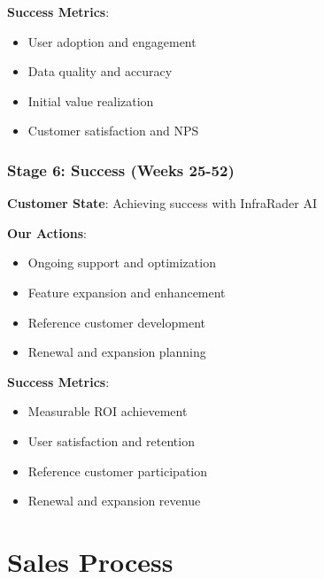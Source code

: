 \documentclass[business]{../templates/infraradar-main}
\begin{document}
\textbf{Success Metrics}:
\begin{itemize}
    \item User adoption and engagement
    \item Data quality and accuracy
    \item Initial value realization
    \item Customer satisfaction and NPS
\end{itemize}

\subsubsection{Stage 6: Success (Weeks 25-52)}
\textbf{Customer State}: Achieving success with InfraRader AI

\textbf{Our Actions}:
\begin{itemize}
    \item Ongoing support and optimization
    \item Feature expansion and enhancement
    \item Reference customer development
    \item Renewal and expansion planning
\end{itemize}

\textbf{Success Metrics}:
\begin{itemize}
    \item Measurable ROI achievement
    \item User satisfaction and retention
    \item Reference customer participation
    \item Renewal and expansion revenue
\end{itemize}

\section{Sales Process}
\end{document}
